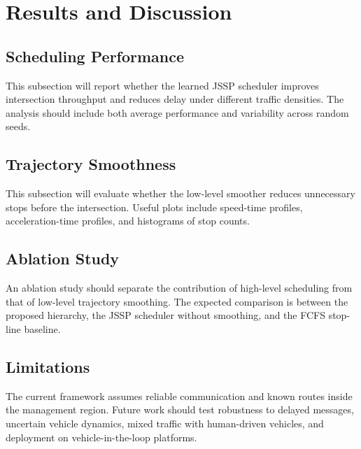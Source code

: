 \section{Results and Discussion}
\label{sec:results_discussion}

\subsection{Scheduling Performance}
This subsection will report whether the learned JSSP scheduler improves intersection throughput and reduces delay under different traffic densities. The analysis should include both average performance and variability across random seeds.

\subsection{Trajectory Smoothness}
This subsection will evaluate whether the low-level smoother reduces unnecessary stops before the intersection. Useful plots include speed-time profiles, acceleration-time profiles, and histograms of stop counts.

\subsection{Ablation Study}
An ablation study should separate the contribution of high-level scheduling from that of low-level trajectory smoothing. The expected comparison is between the proposed hierarchy, the JSSP scheduler without smoothing, and the FCFS stop-line baseline.

\subsection{Limitations}
The current framework assumes reliable communication and known routes inside the management region. Future work should test robustness to delayed messages, uncertain vehicle dynamics, mixed traffic with human-driven vehicles, and deployment on vehicle-in-the-loop platforms.

